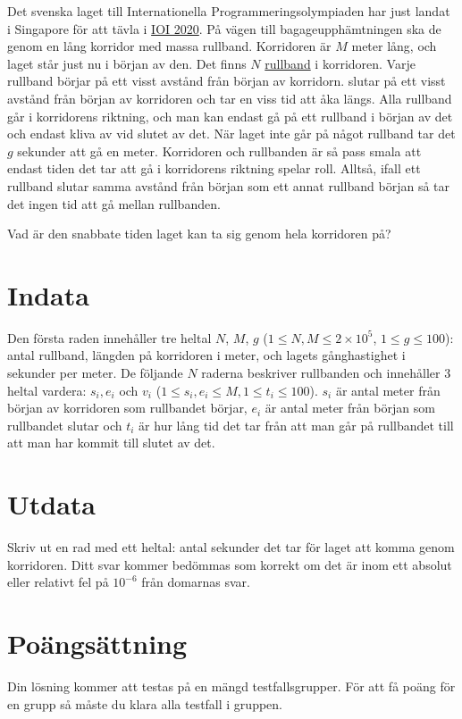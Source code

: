 Det svenska laget till Internationella Programmeringsolympiaden har just landat i Singapore för att
tävla i \href{https://ioi2020.sg/}{IOI 2020}.
På vägen till bagageupphämtningen ska de genom en lång korridor med massa rullband.
Korridoren är $M$ meter lång, och laget står just nu i början av den.
Det finns $N$ \href{https://sv.wikipedia.org/wiki/Rullande_trottoar}{rullband} i korridoren.
Varje rullband börjar på ett visst avstånd från början av korridorn.
slutar på ett visst avstånd från början av korridoren och tar en viss tid att åka längs.
Alla rullband går i korridorens riktning, och man kan endast gå på ett rullband i början av det och endast kliva av vid slutet av det.
När laget inte går på något rullband tar det $g$ sekunder att gå en meter.
Korridoren och rullbanden är så pass smala att endast tiden det tar att gå
i korridorens riktning spelar roll. 
Alltså, ifall ett rullband slutar samma avstånd från början
som ett annat rullband början så tar det ingen tid att gå mellan
rullbanden.

Vad är den snabbate tiden laget kan ta sig genom hela korridoren på?

\section*{Indata}
Den första raden innehåller tre heltal $N$, $M$, $g$ ($1 \le N,M \le 2 \times 10^5$, $1 \le g \le 100$):
antal rullband, längden på korridoren i meter, och lagets gånghastighet i sekunder per meter.
De följande $N$ raderna beskriver rullbanden och innehåller 3 heltal vardera: $s_i, e_i$ och $v_i$
($1\leq s_i,e_i\leq M,1\leq t_i\leq100$).
$s_i$ är antal meter från början av korridoren som rullbandet börjar, $e_i$ är antal meter
från början som rullbandet slutar och $t_i$ är hur lång tid det tar från att man går på
rullbandet till att man har kommit till slutet av det.

\section*{Utdata}
Skriv ut en rad med ett heltal: antal sekunder det tar för laget att komma genom korridoren.
Ditt svar kommer bedömmas som korrekt om det är inom ett absolut eller relativt fel på $10^{-6}$ från domarnas svar.

\section*{Poängsättning}
Din lösning kommer att testas på en mängd testfallsgrupper.
För att få poäng för en grupp så måste du klara alla testfall i gruppen.

